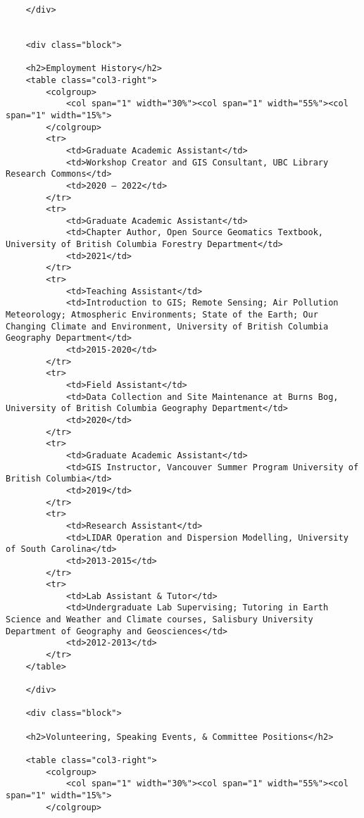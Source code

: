 \documentclass[
]{article}
\begin{document}
\begin{verbatim}
    </div>
    
    
    <div class="block">
        
    <h2>Employment History</h2>
    <table class="col3-right">
        <colgroup>
            <col span="1" width="30%"><col span="1" width="55%"><col span="1" width="15%">
        </colgroup>
        <tr>
            <td>Graduate Academic Assistant</td>
            <td>Workshop Creator and GIS Consultant, UBC Library Research Commons</td>
            <td>2020 – 2022</td>
        </tr>
        <tr>
            <td>Graduate Academic Assistant</td>
            <td>Chapter Author, Open Source Geomatics Textbook, University of British Columbia Forestry Department</td>
            <td>2021</td>
        </tr>
        <tr>
            <td>Teaching Assistant</td>
            <td>Introduction to GIS; Remote Sensing; Air Pollution Meteorology; Atmospheric Environments; State of the Earth; Our Changing Climate and Environment, University of British Columbia Geography Department</td>
            <td>2015-2020</td>
        </tr>
        <tr>
            <td>Field Assistant</td>
            <td>Data Collection and Site Maintenance at Burns Bog, University of British Columbia Geography Department</td>
            <td>2020</td>
        </tr>
        <tr>
            <td>Graduate Academic Assistant</td>
            <td>GIS Instructor, Vancouver Summer Program University of British Columbia</td>
            <td>2019</td>
        </tr>
        <tr>
            <td>Research Assistant</td>
            <td>LIDAR Operation and Dispersion Modelling, University of South Carolina</td>
            <td>2013-2015</td>
        </tr>
        <tr>
            <td>Lab Assistant & Tutor</td>
            <td>Undergraduate Lab Supervising; Tutoring in Earth Science and Weather and Climate courses, Salisbury University Department of Geography and Geosciences</td>
            <td>2012-2013</td>
        </tr>
    </table>
    
    </div>
    
    <div class="block">
    
    <h2>Volunteering, Speaking Events, & Committee Positions</h2>
    
    <table class="col3-right">
        <colgroup>
            <col span="1" width="30%"><col span="1" width="55%"><col span="1" width="15%">
        </colgroup>


\end{verbatim}
\end{document}
